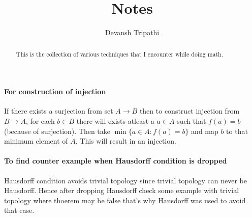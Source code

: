 \documentclass[12pt,reqno]{amsart}
\title{Notes}
\author{Devansh Tripathi}
\theoremstyle{plain}
\theoremstyle{definition}
\begin{document}
\begin{abstract}
    This is the collection of various techniques that I encounter while doing math.
\end{abstract}
\maketitle
\paragraph{\bf For construction of injection} If there exists a surjection from set $A \to B$ then to construct injection from $B \to A$, for each $b \in B$ there will exists atleast a $a \in A$ such that $f(a) = b$ (because of surjection). Then take $\min\{a \in A : f(a) = b\}$ and map $b$ to that minimum element of $A$. This will result in an injection.

\paragraph{\bf To find counter example when Hausdorff condition is dropped}
Hausdorff condition avoids trivial topology since trivial topology can never be Hausdorff. Hence after dropping Hausdorff check some example with trivial topology where thoerem may be false that's why Hausdorff was used to avoid that case.
\end{document}
